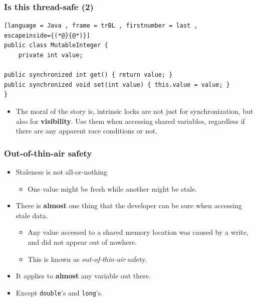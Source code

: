 \documentclass[xcolor={dvipsnames,svgnames},aspectratio=169]{beamer}
\begin{document}
\begin{frame}[fragile]
  \frametitle{Is this thread-safe (2)}

\begin{lstlisting}[language = Java , frame = trBL , firstnumber = last ,
escapeinside={(*@}{@*)}]
public class MutableInteger {
    private int value;

public synchronized int get() { return value; }
public synchronized void set(int value) { this.value = value; }
}
\end{lstlisting}

    \begin{itemize}
  \item[\faBriefcaseMedical]<3-> The moral of the story is, intrinsic locks are
    not just for synchronization, but also for \textbf{visibility}. Use them
    when accessing shared variables, regardless if there are any apparent race
    conditions or not.
  \end{itemize}
\end{frame}

\begin{frame}[fragile]
  \frametitle{Out-of-thin-air safety}

  \begin{itemize}
  \item[\faBook] Staleness is not all-or-nothing
    \begin{itemize}
    \item[\faBook] One value might be fresh while another might be stale.
    \end{itemize}
  \item[\faBook] There is \textbf{almost} one thing that the developer can be sure when
    accessing stale data.
    \begin{itemize}
    \item[\faBook] Any value accessed to a shared memory location was caused by
      a write, and did not appear out of nowhere.
    \item[\faBook] This is known as \emph{out-of-thin-air} safety.
    \end{itemize}
  \item<2->[\faBook] It applies to \textbf{almost} any variable out there.
  \item<3->[\faBook] Except \texttt{double}'s and \texttt{long}'s.
  \end{itemize}


\end{frame}
\end{document}
